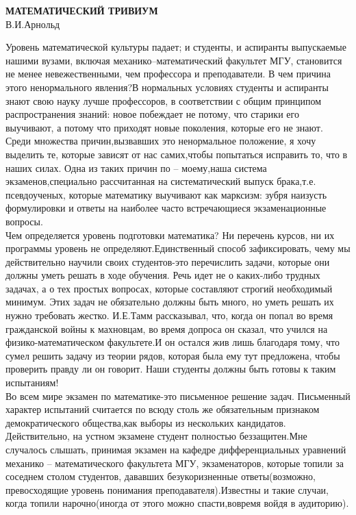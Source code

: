 \documentclass{article}
\begin{document}
\begin{center}
\textbf{МАТЕМАТИЧЕСКИЙ ТРИВИУМ}\\
\textrm{В.И.Арнольд}
\end{center}

\textrm{Уровень математической культуры падает; и студенты, и аспиранты выпускаемые нашими вузами, включая механико--математический факультет МГУ, становится не менее невежественными, чем профессора и преподаватели. В чем причина этого ненормального явления?В нормальных условиях студенты и аспиранты знают свою науку лучше профессоров, в соответствии с общим принципом распространения знаний: новое побеждает не потому, что старики его выучивают, а потому что приходят новые поколения, которые его не знают.\\
Среди множества причин,вызвавших это ненормальное положение, я хочу выделить те, которые зависят от нас самих,чтобы попытаться исправить то, что в наших силах. Одна из таких причин по -- моему,наша система экзаменов,специально рассчитанная на систематический выпуск брака,т.е. псевдоученых, которые математику выучивают как марксизм: зубря наизусть формулировки и ответы на наиболее часто встречающиеся экзаменационные вопросы.\\
Чем определяется уровень подготовки математика? Ни перечень курсов, ни их программы уровень не определяют.Единственный способ зафиксировать, чему мы действительно научили своих студентов-это перечислить задачи, которые они должны уметь решать в ходе обучения.
Речь идет не о каких-либо трудных задачах, а о тех простых вопросах, которые составляют строгий необходимый минимум. Этих задач не обязательно должны быть много, но уметь решать их нужно требовать жестко. И.Е.Тамм рассказывал, что, когда он попал во время гражданской войны к махновцам, во время допроса он сказал, что учился на физико-математическом факультете.И он остался жив лишь благодаря тому, что сумел решить задачу из теории рядов, которая была ему тут предложена, чтобы проверить правду ли он говорит. Наши студенты должны быть готовы к таким испытаниям!\\
Во всем мире экзамен по математике-это письменное решение задач. Письменный характер испытаний считается по всюду столь же обязательным признаком демократического общества,как выборы из нескольких кандидатов. Действительно, на устном экзамене студент полностью беззащитен.Мне случалось слышать, принимая экзамен на кафедре дифференциальных уравнений механико -- математического факультета МГУ, экзаменаторов, которые топили за соседнем столом студентов, дававших безукоризненные ответы(возможно, превосходящие уровень понимания преподавателя).Известны и такие случаи, когда топили нарочно(иногда от этого можно спасти,вовремя войдя в аудиторию).
}
\end{document}
